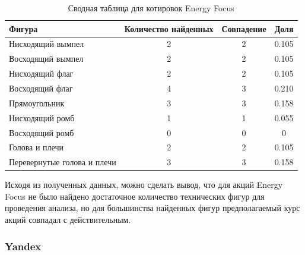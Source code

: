 \documentclass[bachelor, och, coursework]{SCWorks}
\begin{document}
    \begin{table}[!hbt]
        \centering
        \begin{tabular}{|l|c|c|c|}
        \hline
        Фигура                      & \multicolumn{1}{l|}{Количество найденных} & Совпадение & Доля  \\ \hline
        Нисходящий вымпел           & 2                                         & 2          & 0.105 \\ \hline
        Восходящий вымпел           & 2                                         & 2          & 0.105 \\ \hline
        Нисходящий флаг             & 2                                         & 2          & 0.105 \\ \hline
        Восходящий флаг             & 4                                         & 3          & 0.210 \\ \hline
        Прямоугольник               & 3                                         & 3          & 0.158 \\ \hline
        Нисходящий ромб             & 1                                         & 1          & 0.055 \\ \hline
        Восходящий ромб             & 0                                         & 0          & 0     \\ \hline
        Голова и плечи              & 2                                         & 2          & 0.105 \\ \hline
        Перевернутые голова и плечи & 3                                         & 3          & 0.158 \\ \hline
        \end{tabular}
        \captionsetup{justification=centering}
        \caption{Сводная таблица для котировок Energy Focus}       
    \end{table}

    Исходя из полученных данных, можно сделать вывод, что для акций Energy Focus
    не было найдено достаточное количество технических фигур для проведения 
    анализа, но для большинства найденных фигур предполагаемый курс акций 
    совпадал с действительным.


    \subsubsection{Yandex}
    
\end{document}
